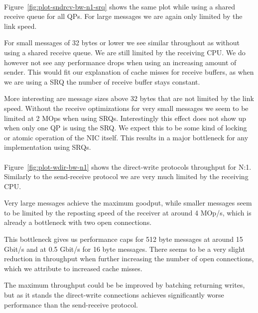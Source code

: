 \paragraph{} Figure~\ref{fig:plot-sndrcv-bw-n1-srq} shows the same plot while using a shared receive queue for all QPs. For
large messages we are again only limited by the link speed.

For small messages of 32 bytes or lower we see similar throughout as without using a shared receive queue. We are still
limited by the receiving CPU. We do however not see any performance drops when using an increasing amount of sender. This
would fit our explanation of cache misses for receive buffers, as when we are using a SRQ the number of receive buffer stays
constant.

More interesting are message sizes above 32 bytes that are not limited by the link speed. Without the receive optimizations 
for very small messages we seem to be limited at 2 MOps when using SRQs. Interestingly this effect does not show up when only
one QP is using the SRQ. We expect this to be some kind of locking or atomic operation of the NIC itself. This results in a
major bottleneck for any implementation using SRQs.

\paragraph{} Figure~\ref{fig:plot-wdir-bw-n1} shows the direct-write protocols throughput for N:1. Similarly to the 
send-receive protocol we are very much limited by the receiving CPU.

Very large messages achieve the maximum goodput,  while smaller messages seem to be limited by the reposting speed of the 
receiver at around 4 MOp/s, which is already a bottleneck with two open connections.

This bottleneck gives us performance caps for 512 byte messages at around 15 Gbit/s and at 0.5 Gbit/s for 16 byte messages.
There seems to be a very slight reduction in throughput when further increasing the number of open connections, which we 
attribute to increased cache misses.

The maximum throughput could be be improved by batching returning writes, but as it stands the direct-write connections
achieves significantly worse performance than the send-receive protocol.



